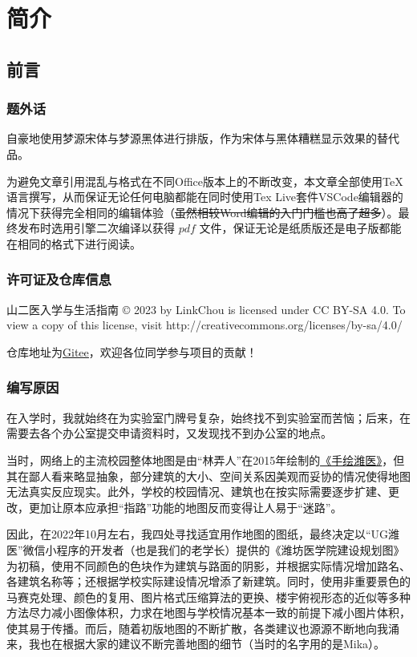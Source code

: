 \chapter[简介]{简介}

\section[前言]{前言}
\subsection[题外话]{题外话}
自豪地使用梦源宋体与梦源黑体进行排版，作为宋体与黑体糟糕显示效果的替代品。

为避免文章引用混乱与格式在不同Office版本上的不断改变，本文章全部使用\TeX 语言撰写，从而保证无论任何电脑都能在同时使用Tex Live套件VSCode编辑器\footnotemark 的情况下获得完全相同的编辑体验（\sout{虽然相较Word编辑的入门门槛也高了超多}）。最终发布时选用\XeLaTeX 引擎二次编译以获得 $pdf$ 文件，保证无论是纸质版还是电子版都能在相同的格式下进行阅读。

\subsection[许可证及仓库信息]{许可证及仓库信息}
山二医入学与生活指南 © 2023 by LinkChou is licensed under CC BY-SA 4.0. To view a copy of this license, visit http://creativecommons.org/licenses/by-sa/4.0/

仓库地址为\uline{\href{https://gitee.com/mikazo/guide_for_freshman}{Gitee}}，欢迎各位同学参与项目的贡献！

\subsection[编写原因]{编写原因}
在入学时，我就始终在为实验室门牌号复杂，始终找不到实验室而苦恼；后来，在需要去各个办公室提交申请资料时，又发现找不到办公室的地点。

当时，网络上的主流校园整体地图是由“林弄人”在2015年绘制的\uline{\href{https://www.zcool.com.cn/work/ZMTgxMDQwMjg=.html?}{《手绘潍医》}}，但其在鄙人看来略显抽象，部分建筑的大小、空间关系因美观而妥协的情况使得地图无法真实反应现实。此外，学校的校园情况、建筑也在按实际需要逐步扩建、更改，更加让原本应承担“指路”功能的地图反而变得让人易于“迷路”。

因此，在2022年10月左右，我四处寻找适宜用作地图的图纸，最终决定以“UG潍医”微信小程序的开发者（也是我们的老学长）提供的《潍坊医学院建设规划图》为初稿，使用不同颜色的色块作为建筑与路面的阴影，并根据实际情况增加路名、各建筑名称等；还根据学校实际建设情况增添了新建筑。同时，使用非重要景色的马赛克处理、颜色的复用、图片格式压缩算法的更换、楼宇俯视形态的近似等多种方法尽力减小图像体积，力求在地图与学校情况基本一致的前提下减小图片体积，使其易于传播。而后，随着初版地图的不断扩散，各类建议也源源不断地向我涌来，我也在根据大家的建议不断完善地图的细节（当时的名字用的是Mika）。

